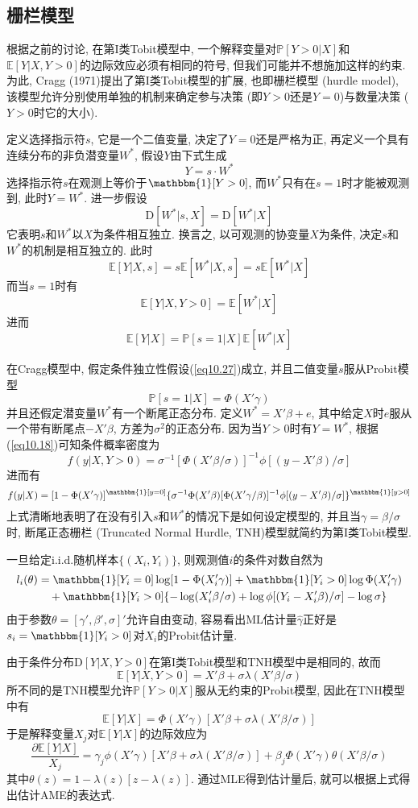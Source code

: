 \documentclass[cn, 12pt, math=mtpro2, bibstyle=apa, blue, twocol]{elegantbook}
\newcommand{\E}{\mathbb{E}}
\newcommand{\PP}{\mathbb{P}}
\begin{document}
\subsection{栅栏模型}
根据之前的讨论, 在第I类Tobit模型中, 一个解释变量对$\PP[Y>0|X]$和$\E[Y|X,Y>0]$的边际效应必须有相同的符号, 但我们可能并不想施加这样的约束. 为此, Cragg (1971)提出了第I类Tobit模型的扩展, 也即栅栏模型 (hurdle model), 该模型允许分别使用单独的机制来确定参与决策 (即$Y>0$还是$Y=0$)与数量决策 ($Y>0$时它的大小).

定义选择指示符$s$, 它是一个二值变量, 决定了$Y=0$还是严格为正, 再定义一个具有连续分布的非负潜变量$W^\ast$, 假设$Y$由下式生成
$$Y=s\cdot W^\ast$$
选择指示符$s$在观测上等价于$\mathbbm{1}[Y>0]$, 而$W^\ast$只有在$s=1$时才能被观测到, 此时$Y=W^\ast$. 进一步假设
\begin{equation}\label{eq10.27}
  \text{D}[W^\ast|s,X]=\text{D}[W^\ast|X]
\end{equation}
它表明$s$和$W^\ast$以$X$为条件相互独立. 换言之, 以可观测的协变量$X$为条件, 决定$s$和$W^\ast$的机制是相互独立的. 此时
$$\E[Y|X,s]=s\E[W^\ast|X,s]=s\E[W^\ast|X]$$
而当$s=1$时有
$$\E[Y|X,Y>0]=\E[W^\ast|X]$$
进而
$$\E[Y|X]=\PP[s=1|X]\E[W^\ast|X]$$

在Cragg模型中, 假定条件独立性假设(\ref{eq10.27})成立, 并且二值变量$s$服从Probit模型
$$\PP[s=1|X]=\Phi(X'\gamma)$$
并且还假定潜变量$W^\ast$有一个断尾正态分布. 定义$W^\ast=X'\beta+e$, 其中给定$X$时$e$服从一个带有断尾点$-X'\beta$, 方差为$\sigma^2$的正态分布. 因为当$Y>0$时有$Y=W^\ast$, 根据(\ref{eq10.18})可知条件概率密度为
$$f(y|X,Y>0)=\sigma^{-1}[\Phi(X'\beta/\sigma)]^{-1}\phi[(y-X'\beta)/\sigma]$$
进而有
$$f(y|X)=[1-\Phi(X'\gamma)]^{\mathbbm{1}[y=0]}\{\sigma^{-1}\Phi(X{'}\beta)[\Phi(X{'}\gamma/\beta)]^{-1}\phi[(y-X{'}\beta)/\sigma]\}^{\mathbbm{1}[y>0]}$$
上式清晰地表明了在没有引入$s$和$W^\ast$的情况下是如何设定模型的, 并且当$\gamma=\beta/\sigma$时, 断尾正态栅栏 (Truncated Normal Hurdle, TNH)模型就简约为第I类Tobit模型.

一旦给定i.i.d.随机样本$\{(X_i,Y_i)\}$, 则观测值$i$的条件对数自然为
\begin{align*}
l_i(\theta)&=\mathbbm{1}[Y_i=0]\log[1-\Phi(X_i'\gamma)]+\mathbbm{1}[Y_i>0]\log\Phi(X_i'\gamma) \\
&\quad +\mathbbm{1}[Y_i>0]\{-\log (X_i'\beta/\sigma)+\log\phi[(Y_i-X_i'\beta)/\sigma]-\log\sigma\}
\end{align*}
由于参数$\theta=[\gamma',\beta',\sigma]'$允许自由变动, 容易看出ML估计量$\hat{\gamma}$正好是$s_i=\mathbbm{1}[Y_i>0]$对$X_i$的Probit估计量.

由于条件分布$\text{D}[Y|X,Y>0]$在第I类Tobit模型和TNH模型中是相同的, 故而
$$\E[Y|X,Y>0]=X'\beta+\sigma\lambda(X'\beta/\sigma)$$
所不同的是TNH模型允许$\PP[Y>0|X]$服从无约束的Probit模型, 因此在TNH模型中有
$$\E[Y|X]=\Phi(X'\gamma)[X'\beta+\sigma\lambda(X'\beta/\sigma)]$$
于是解释变量$X_j$对$\E[Y|X]$的边际效应为
$$\frac{\partial \E[Y|X]}{X_j}=\gamma_j\phi(X'\gamma)[X'\beta+\sigma\lambda(X'\beta/\sigma)]+\beta_j\Phi(X'\gamma)\theta(X'\beta/\sigma)$$
其中$\theta(z)=1-\lambda(z)[z-\lambda(z)]$. 通过MLE得到估计量后, 就可以根据上式得出估计AME的表达式.
\end{document}
